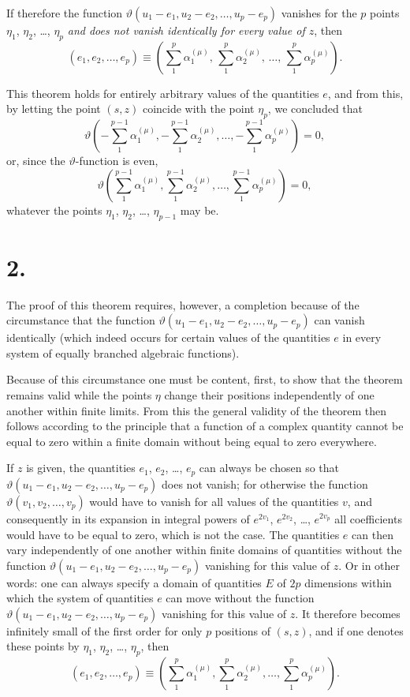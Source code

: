 \documentclass{article}
\begin{document}
If therefore the function $\vartheta(u_1-e_1, u_2-e_2, \dots, u_p-e_p)$ vanishes for the $p$ points $\eta_1$, $\eta_2$, \dots, $\eta_p$ \emph{and does not vanish identically for every value of $z$}, then
\[
(e_1, e_2, \dots, e_p) \equiv \left(\sum_1^p \alpha_1^{(\mu)},\, \sum_1^p \alpha_2^{(\mu)},\, \dots,\, \sum_1^p \alpha_p^{(\mu)}\right).
\]

This theorem holds for entirely arbitrary values of the quantities $e$, and from this, by letting the point $(s, z)$ coincide with the point $\eta_p$, we concluded that
\[
\vartheta\left(-\sum_1^{p-1} \alpha_1^{(\mu)}, -\sum_1^{p-1} \alpha_2^{(\mu)}, \dots, -\sum_1^{p-1} \alpha_p^{(\mu)}\right) = 0,
\]
or, since the $\vartheta$-function is even,
\[
\vartheta\left(\sum_1^{p-1} \alpha_1^{(\mu)}, \sum_1^{p-1} \alpha_2^{(\mu)}, \dots, \sum_1^{p-1} \alpha_p^{(\mu)}\right) = 0,
\]
whatever the points $\eta_1$, $\eta_2$, \dots, $\eta_{p-1}$ may be.

\section*{2.}

The proof of this theorem requires, however, a completion because of the circumstance that the function $\vartheta(u_1-e_1, u_2-e_2, \dots, u_p-e_p)$ can vanish identically (which indeed occurs for certain values of the quantities $e$ in every system of equally branched algebraic functions).

Because of this circumstance one must be content, first, to show that the theorem remains valid while the points $\eta$ change their positions independently of one another within finite limits. From this the general validity of the theorem then follows according to the principle that a function of a complex quantity cannot be equal to zero within a finite domain without being equal to zero everywhere.

If $z$ is given, the quantities $e_1$, $e_2$, \dots, $e_p$ can always be chosen so that $\vartheta(u_1-e_1, u_2-e_2, \dots, u_p-e_p)$ does not vanish; for otherwise the function $\vartheta(v_1, v_2, \dots, v_p)$ would have to vanish for all values of the quantities $v$, and consequently in its expansion in integral powers of $e^{2v_1}$, $e^{2v_2}$, \dots, $e^{2v_p}$ all coefficients would have to be equal to zero, which is not the case. The quantities $e$ can then vary independently of one another within finite domains of quantities without the function $\vartheta(u_1-e_1, u_2-e_2, \dots, u_p-e_p)$ vanishing for this value of $z$. Or in other words: one can always specify a domain of quantities $E$ of $2p$ dimensions within which the system of quantities $e$ can move without the function $\vartheta(u_1-e_1, u_2-e_2, \dots, u_p-e_p)$ vanishing for this value of $z$. It therefore becomes infinitely small of the first order for only $p$ positions of $(s, z)$, and if one denotes these points by $\eta_1$, $\eta_2$, \dots, $\eta_p$, then
\[
\tag{(1.)}
(e_1, e_2, \dots, e_p) \equiv \left(\sum_1^p \alpha_1^{(\mu)}, \sum_1^p \alpha_2^{(\mu)}, \dots, \sum_1^p \alpha_p^{(\mu)}\right).
\]
\end{document}
